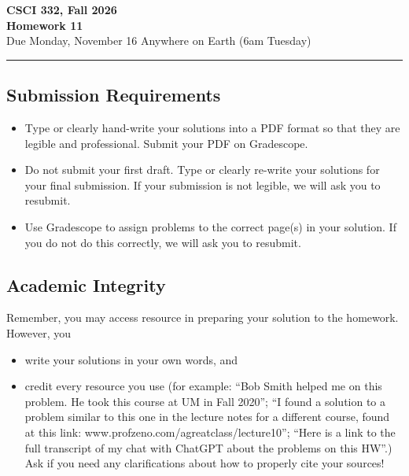 \documentclass[11pt]{article}
\begin{document}
\begin{center}
\Large\textbf{CSCI 332, Fall 2026}%
\\
\LARGE\textbf{Homework 11}%
\\[0.5ex]
\large Due Monday, November 16 Anywhere on Earth (6am Tuesday)
\end{center}

\bigskip
\hrule
\bigskip

\subsection*{Submission Requirements}
\begin{itemize}
    \item Type or clearly hand-write your solutions into a PDF format so that they are legible and professional. Submit your PDF on Gradescope. 
    \item Do not submit your first draft. Type or clearly re-write your solutions for your final submission. If your submission is not legible, we will ask you to resubmit.
    \item Use Gradescope to assign problems to the correct page(s) in your solution. If you do not do this correctly, we will ask you to resubmit.
\end{itemize}

\subsection*{Academic Integrity}

Remember, you may access  resource in preparing your solution to the homework. However, you 
\begin{itemize}
    \item write your solutions in your own words, and
    \item credit every resource you use (for example: ``Bob Smith helped me on
    this problem. He took this course at UM in Fall 2020''; ``I found a solution
    to a problem similar to this one in the lecture notes for a different
    course, found at this link: www.profzeno.com/agreatclass/lecture10''; ``Here is a link to the full transcript of my chat with ChatGPT about the problems on this HW''.)
    Ask if you need any clarifications about how to properly cite your sources!
\end{itemize}




\newpage
    
\end{document}
